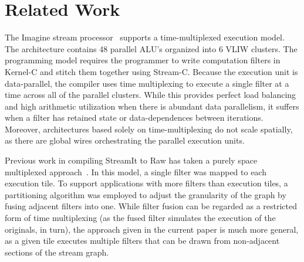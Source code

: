\section{Related Work}
\label{sec:related}

The Imagine stream processor~\cite{rixner98bandwidthefficient}
supports a time-multiplexed execution model.  The architecture
contains 48 parallel ALU's organized into 6 VLIW clusters.  The
programming model requires the programmer to write computation filters
in Kernel-C and stitch them together using Stream-C.  Because the
execution unit is data-parallel, the compiler uses time multiplexing
to execute a single filter at a time across all of the parallel
clusters.  While this provides perfect load balancing and high
arithmetic utilization when there is abundant data parallelism, it
suffers when a filter has retained state or data-dependences between
iterations.  Moreover, architectures based solely on
time-multiplexing do not scale spatially, as there are global wires
orchestrating the parallel execution units. 

Previous work in compiling StreamIt to Raw has taken a purely space
multiplexed approach~\cite{streamit-asplos}.  In this model, a single
filter was mapped to each execution tile.  To support applications
with more filters than execution tiles, a partitioning algorithm was
employed to adjust the granularity of the graph by fusing adjacent
filters into one.  While filter fusion can be regarded as a restricted
form of time multiplexing (as the fused filter simulates the execution
of the originals, in turn), the approach given in the current paper is
much more general, as a given tile executes multiple filters
that can be drawn from non-adjacent sections of the stream graph.


